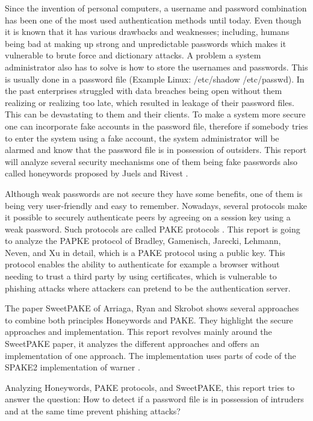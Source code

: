 \documentclass[../main.tex]{subfiles}
\begin{document}
Since the invention of personal computers, a username and password combination
has been one of the most used authentication methods until today. Even though
it is known that it has various drawbacks and weaknesses; including, humans
being bad at making up strong and unpredictable passwords which makes it
vulnerable to brute force and dictionary attacks. A problem a system
administrator also has to solve is how to store the usernames and passwords.
This is usually done in a password file (Example Linux: /etc/shadow
/etc/passwd). In the past enterprises struggled with data breaches being open
without them realizing or realizing too late, which resulted in leakage of their
password files. This can be devastating to them and their clients. To make a
system more secure one can incorporate fake accounts in the password file,
therefore if somebody tries to enter the system using a fake account, the
system administrator will be alarmed and know that the password file is in
possession of outsiders. This report will analyze several security mechanisms
one of them being fake passwords also called honeywords proposed by Juels and
Rivest \cite{juels2013honeywords}.  

Although weak passwords are not secure they have some benefits, one of them is
being very user-friendly and easy to remember. Nowadays, several protocols make
it possible to securely authenticate peers by agreeing on a session key using a
weak password. Such protocols are called PAKE protocols
\cite{bellovin1992encrypted} \cite{bellare2000authenticated}
\cite{boyko2000provably} \cite{canetti2005universally}. This report is going to
analyze the PAPKE protocol of Bradley, Gamenisch, Jarecki, Lehmann, Neven, and
Xu \cite{bradley2019password} in detail, which is a PAKE protocol using a
public key. This protocol enables the ability to authenticate for example a
browser without needing to trust a third party by using certificates, which is
vulnerable to phishing attacks where attackers can pretend to be the
authentication server.

The paper SweetPAKE of Arriaga, Ryan and Skrobot \cite{marjan2023} shows
several approaches to combine both principles Honeywords and PAKE. They
highlight the secure approaches and implementation. This report revolves mainly
around the SweetPAKE paper, it analyzes the different approaches and offers an
implementation of one approach. The implementation uses parts of code of the
SPAKE2 implementation of warner \cite{Warner2016}.

Analyzing Honeywords, PAKE protocols, and SweetPAKE, this report tries to
answer the question: How to detect if a password file is in possession of
intruders and at the same time prevent phishing attacks? 
\end{document}
